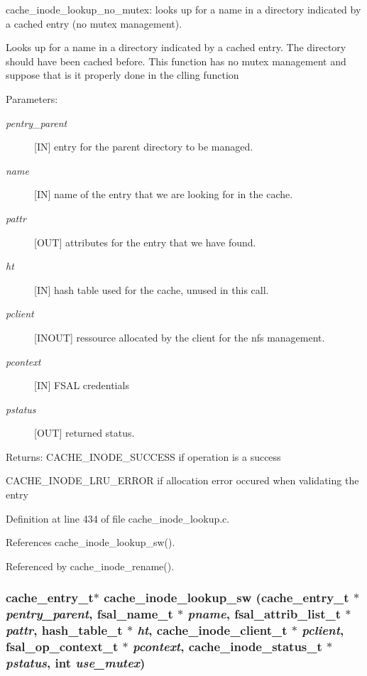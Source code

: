 cache\_\-inode\_\-lookup\_\-no\_\-mutex: looks up for a name in a directory indicated by a cached entry (no mutex management).

Looks up for a name in a directory indicated by a cached entry. The directory should have been cached before. This function has no mutex management and suppose that is it properly done in the clling function

\begin{Desc}
\item[Parameters:]
\begin{description}
\item[{\em pentry\_\-parent}][IN] entry for the parent directory to be managed. \item[{\em name}][IN] name of the entry that we are looking for in the cache. \item[{\em pattr}][OUT] attributes for the entry that we have found. \item[{\em ht}][IN] hash table used for the cache, unused in this call. \item[{\em pclient}][INOUT] ressource allocated by the client for the nfs management. \item[{\em pcontext}][IN] FSAL credentials \item[{\em pstatus}][OUT] returned status.\end{description}
\end{Desc}
\begin{Desc}
\item[Returns:]CACHE\_\-INODE\_\-SUCCESS if operation is a success \par
 

CACHE\_\-INODE\_\-LRU\_\-ERROR if allocation error occured when validating the entry \end{Desc}


Definition at line 434 of file cache\_\-inode\_\-lookup.c.

References cache\_\-inode\_\-lookup\_\-sw().

Referenced by cache\_\-inode\_\-rename().
\subsubsection{\setlength{\rightskip}{0pt plus 5cm}cache\_\-entry\_\-t$\ast$ cache\_\-inode\_\-lookup\_\-sw (cache\_\-entry\_\-t $\ast$ {\em pentry\_\-parent}, fsal\_\-name\_\-t $\ast$ {\em pname}, fsal\_\-attrib\_\-list\_\-t $\ast$ {\em pattr}, hash\_\-table\_\-t $\ast$ {\em ht}, cache\_\-inode\_\-client\_\-t $\ast$ {\em pclient}, fsal\_\-op\_\-context\_\-t $\ast$ {\em pcontext}, cache\_\-inode\_\-status\_\-t $\ast$ {\em pstatus}, int {\em use\_\-mutex})}\label{cache__inode__lookup_8c_a0}


